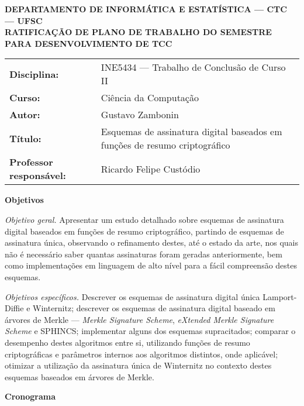 \documentclass[11pt]{letter}
\begin{document}
\pagestyle{empty}

\begin{center}
  \textbf{
    DEPARTAMENTO DE INFORMÁTICA E ESTATÍSTICA --- CTC --- UFSC \\
    RATIFICAÇÃO DE PLANO DE TRABALHO DO SEMESTRE PARA DESENVOLVIMENTO DE TCC
  }
\end{center}

\vspace{1em}
\setlength\extrarowheight{5pt}
\begin{tabular}{l l}
  \textbf{Disciplina:}  & INE5434 --- Trabalho de Conclusão de Curso II \\
  \textbf{Curso:}       & Ciência da Computação                         \\
  \textbf{Autor:}       & Gustavo Zambonin                              \\
  \textbf{Título:}      & Esquemas de assinatura digital baseados
                          em funções de resumo criptográfico            \\
  \textbf{Professor responsável:} & Ricardo Felipe Custódio             \\
\end{tabular}


\vspace{1em}
{\large \textbf{Objetivos}}

\noindent \emph{Objetivo geral.} Apresentar um estudo detalhado sobre esquemas
de assinatura digital baseados em funções de resumo criptográfico, partindo de
esquemas de assinatura única, observando o refinamento destes, até o estado da
arte, nos quais não é necessário saber quantas assinaturas foram geradas
anteriormente, bem como implementações em linguagem de alto nível para a fácil
compreensão destes esquemas.

\noindent \emph{Objetivos específicos.} Descrever os esquemas de assinatura
digital única Lamport-Diffie e Winternitz; descrever os esquemas de assinatura
digital baseado em árvores de Merkle --- \emph{Merkle Signature Scheme},
\emph{eXtended Merkle Signature Scheme} e SPHINCS; implementar alguns dos
esquemas supracitados; comparar o desempenho destes algoritmos entre si,
utilizando funções de resumo criptográficas e parâmetros internos aos
algoritmos distintos, onde aplicável; otimizar a utilização da assinatura única
de Winternitz no contexto destes esquemas baseados em árvores de Merkle.

\vspace{1em}
{\large \textbf{Cronograma}}
\end{document}
